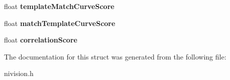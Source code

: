 \begin{DoxyCompactItemize}
\item 
\hypertarget{structGeometricPatternMatch__struct_ace18aec32a6f1352f485620a6a643aa6}{float {\bfseries template\-Match\-Curve\-Score}}\label{structGeometricPatternMatch__struct_ace18aec32a6f1352f485620a6a643aa6}

\item 
\hypertarget{structGeometricPatternMatch__struct_ad9368f6cac538863bf062b21f4fea647}{float {\bfseries match\-Template\-Curve\-Score}}\label{structGeometricPatternMatch__struct_ad9368f6cac538863bf062b21f4fea647}

\item 
\hypertarget{structGeometricPatternMatch__struct_afed75175193eb0b4a23888914529e8f1}{float {\bfseries correlation\-Score}}\label{structGeometricPatternMatch__struct_afed75175193eb0b4a23888914529e8f1}

\end{DoxyCompactItemize}


\-The documentation for this struct was generated from the following file\-:\begin{DoxyCompactItemize}
\item 
nivision.\-h\end{DoxyCompactItemize}

